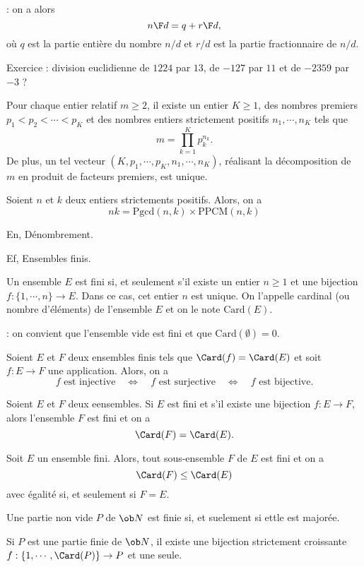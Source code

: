 \Remarque : on a alors 
$$
{n\F d}=q+{r\F d}, 
$$
o\`u $q$ est la partie enti\`ere du nombre $n/d$ et $r/d$ est la partie fractionnaire de $n/d$. 
\bigskip

Exercice :  division euclidienne de $1224$ par $13$, de $-127$ par $11$ et de $-2359$ par $-3$ ? 
\bigskip

\Theoreme [Title=D\'ecomposition en facteurs premiers] Pour chaque entier relatif $m\ge2$, il existe un entier $K\ge1$, 
des nombres premiers $p_1<p_2< \cdots< p_K$ et des nombres entiers strictement positifs $n_1,\cdots, n_K$ tels que 
$$
m=\prod_{k=1}^K p_k^{n_k}. 
$$
De plus, un tel vecteur $(K,p_1,\cdots, p_K, n_1,\cdots,n_K)$, r\'ealisant la d\'ecomposition de $m$ en produit de facteurs premiers, est unique. 
\bigskip

\Propriete []  Soient $n$ et $k$ deux entiers strictements positifs. Alors, on a
$$
nk=\mbox{Pgcd}(n,k)\times \mbox{PPCM}(n,k)
$$ 

\Section En, D\'enombrement. 

\Subsection Ef, Ensembles finis. 

\Definition []  Un ensemble $E$ est fini si, et seulement s'il existe un entier $n\ge1$ et une bijection $f:\{1,\cdots, n\}\to E$. 
Dans ce cas, cet entier $n$ est unique. On l'appelle cardinal (ou nombre d'\'el\'ements) de l'ensemble $E$ et on le note $\mbox{Card}(E)$. 
\bigskip

\Remarque : on convient que l'ensemble vide est fini et que $\mbox{Card}(\emptyset)=0$. 
\bigskip

\Propriete []  Soient $E$ et $F$ deux ensembles finis tels que $\Card(f)=\Card(E)$ et soit $f:E\to F$ une application. Alors, on a 
$$
f\mbox{ est injective}\quad\Longleftrightarrow\quad f\mbox{ est surjective}\quad\Longleftrightarrow\quad f\mbox{ est bijective}.
$$

\Propriete []  Soient $E$ et $F$ deux eensembles. Si $E$ est fini et s'il existe une bijection $f:E\to F$, alors l'ensemble $F$ est fini et on a 
$$
\Card(F)=\Card(E).
$$

\Propriete []  Soit $E$ un ensemble fini. Alors, tout sous-ensemble $F$ de $E$ est fini et on a 
$$
\Card(F)\le\Card(E)
$$
avec \'egalit\'e si, et seulement si $F=E$.
\bigskip

\Propriete []  Une partie non vide $P$ de $\ob N$ est finie si, et suelement si ettle est major\'ee. 
\bigskip

 
\Propriete []  Si $P$ est une partie finie de $\ob N$, il existe une bijection strictement croissante $f:\{1,\cdots,\Card(P)\}\to P$ et une seule. 
\bigskip

